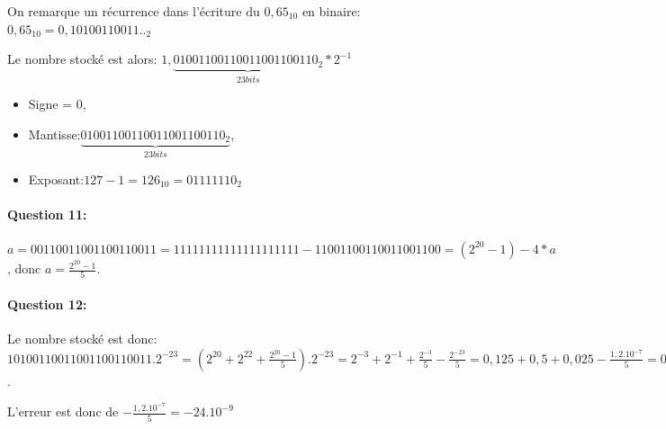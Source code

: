 On remarque un récurrence dans l'écriture du $0,65_{10}$ en binaire: $0,65_{10}=0,10100110011.._2$

Le nombre stocké est alors:
$1,\underbrace{01001100110011001100110_2}_{23 bits}*2^{-1}$

\begin{itemize}
 \item Signe = $0$,
 \item Mantisse:$\underbrace{01001100110011001100110_2}_{23 bits}$,
 \item Exposant:$127-1=126_{10}=01111110_2$
\end{itemize}

\paragraph{Question 11:}

$a=00110011001100110011=11111111111111111111-11001100110011001100=
(2^{20}-1)-4*a$, donc $a=\frac{2^{20}-1}{5}$.

\paragraph{Question 12:}

Le nombre stocké est donc: $10100110011001100110011.2^{-23}=(2^{20}+2^{22}+\frac{2^{20}-1}{5}).2^{-23}=2^{-3}+2^{-1}+\frac{2^{-3}}{5}-\frac{2^{-23}}{5}=0,125+0,5+0,025-\frac{1,2.10^{-7}}{5}=0,65-24.10^{-9}$.

L'erreur est donc de $-\frac{1,2.10^{-7}}{5}=-24.10^{-9}$


